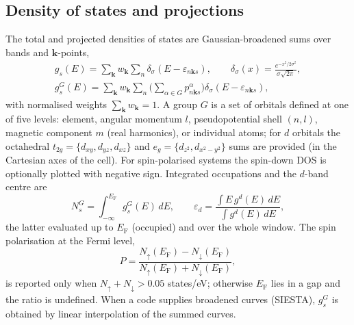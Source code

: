 \documentclass[11pt,a4paper]{article}
\newcommand{\eF}{E_\mathrm{F}}
\begin{document}
\subsection{Density of states and projections}
The total and projected densities of states are Gaussian-broadened sums over bands and $\bm{k}$-points,
\begin{gather}
g_s(E)=\sum_{\bm{k}}w_{\bm{k}}\sum_n\delta_\sigma(E-\varepsilon_{n\bm{k} s}),\qquad
\delta_\sigma(x)=\frac{e^{-x^2/2\sigma^2}}{\sigma\sqrt{2\pi}},\\
g^{G}_s(E)=\sum_{\bm{k}}w_{\bm{k}}\sum_n\Big(\sum_{\alpha\in G}p^{\alpha}_{n\bm{k} s}\Big)\delta_\sigma(E-\varepsilon_{n\bm{k} s}),
\end{gather}
with normalised weights $\sum_{\bm{k}}w_{\bm{k}}=1$. A group $G$ is a set of orbitals defined at one of five levels: element, angular momentum $l$, pseudopotential shell $(n,l)$, magnetic component $m$ (real harmonics), or individual atoms; for $d$ orbitals the octahedral $t_{2g}=\{d_{xy},d_{yz},d_{xz}\}$ and $e_g=\{d_{z^2},d_{x^2-y^2}\}$ sums are provided (in the Cartesian axes of the cell). For spin-polarised systems the spin-down DOS is optionally plotted with negative sign. Integrated occupations and the $d$-band centre \cite{hammer1995} are
\begin{equation}
N^{G}_s=\int_{-\infty}^{\eF}g^{G}_s(E)\,dE,\qquad \varepsilon_d=\frac{\int E\,g^{d}(E)\,dE}{\int g^{d}(E)\,dE},
\end{equation}
the latter evaluated up to $\eF$ (occupied) and over the whole window. The spin polarisation at the Fermi level,
\begin{equation}
P=\frac{N_\uparrow(\eF)-N_\downarrow(\eF)}{N_\uparrow(\eF)+N_\downarrow(\eF)},
\end{equation}
is reported only when $N_\uparrow+N_\downarrow>0.05$ states/eV; otherwise $\eF$ lies in a gap and the ratio is undefined. When a code supplies broadened curves (SIESTA), $g^{G}_s$ is obtained by linear interpolation of the summed curves.
\end{document}
